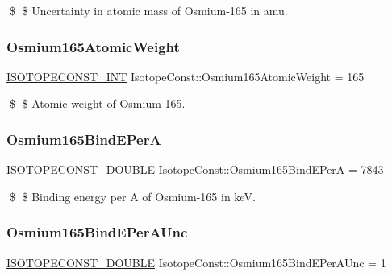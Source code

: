 \$ \$ Uncertainty in atomic mass of Osmium-\/165 in amu. \mbox{\label{group___isotope_const-_osmium-_os165_ga6f512a9b27723401eea27ca3e8325a6c}} 
\subsubsection{\texorpdfstring{Osmium165\+Atomic\+Weight}{Osmium165AtomicWeight}}
{\footnotesize\ttfamily \mbox{\hyperlink{group___isotope_const-_macros_ga5f18360b3e99483a35c32d789e62621c}{I\+S\+O\+T\+O\+P\+E\+C\+O\+N\+S\+T\+\_\+\+I\+NT}} Isotope\+Const\+::\+Osmium165\+Atomic\+Weight = 165}

\$ \$ Atomic weight of Osmium-\/165. \mbox{\label{group___isotope_const-_osmium-_os165_ga02c5987b68c1944e71b4634d571e3bfb}} 
\subsubsection{\texorpdfstring{Osmium165\+Bind\+E\+PerA}{Osmium165BindEPerA}}
{\footnotesize\ttfamily \mbox{\hyperlink{group___isotope_const-_macros_ga8f45a7272ce02c0b4c65c44636ed719a}{I\+S\+O\+T\+O\+P\+E\+C\+O\+N\+S\+T\+\_\+\+D\+O\+U\+B\+LE}} Isotope\+Const\+::\+Osmium165\+Bind\+E\+PerA = 7843}

\$ \$ Binding energy per A of Osmium-\/165 in keV. \mbox{\label{group___isotope_const-_osmium-_os165_ga154545baf80273fe0f7cec7355a7c884}} 
\subsubsection{\texorpdfstring{Osmium165\+Bind\+E\+Per\+A\+Unc}{Osmium165BindEPerAUnc}}
{\footnotesize\ttfamily \mbox{\hyperlink{group___isotope_const-_macros_ga8f45a7272ce02c0b4c65c44636ed719a}{I\+S\+O\+T\+O\+P\+E\+C\+O\+N\+S\+T\+\_\+\+D\+O\+U\+B\+LE}} Isotope\+Const\+::\+Osmium165\+Bind\+E\+Per\+A\+Unc = 1}

